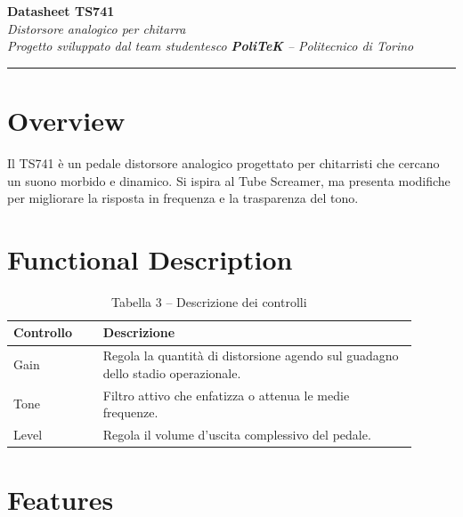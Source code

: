 \documentclass[a4paper,11pt]{article}
\begin{document}
\begin{center}
    {\LARGE \textbf{Datasheet TS741}}\\
    \vspace{4pt}
    \textit{Distorsore analogico per chitarra\\Progetto sviluppato dal team studentesco \textbf{PoliTeK} – Politecnico di Torino}\\
    \vspace{4pt}
    \rule{\linewidth}{0.5pt}
\end{center}

\section{Overview}
Il TS741 è un pedale distorsore analogico progettato per chitarristi che cercano un suono morbido e dinamico. Si ispira al Tube Screamer, ma presenta modifiche per migliorare la risposta in frequenza e la trasparenza del tono.

\section{Functional Description}

\begin{table}[h!]
    \centering
    \begin{tabular}{|p{0.2\linewidth}|p{0.7\linewidth}|}
        \hline
        \textbf{Controllo} & \textbf{Descrizione} \\
        \hline
        Gain & Regola la quantità di distorsione agendo sul guadagno dello stadio operazionale. \\
        \hline
        Tone & Filtro attivo che enfatizza o attenua le medie frequenze. \\
        \hline
        Level & Regola il volume d’uscita complessivo del pedale. \\
        \hline
    \end{tabular}
    \caption*{Tabella 3 – Descrizione dei controlli}
\end{table}

\section{Features}
\end{document}
